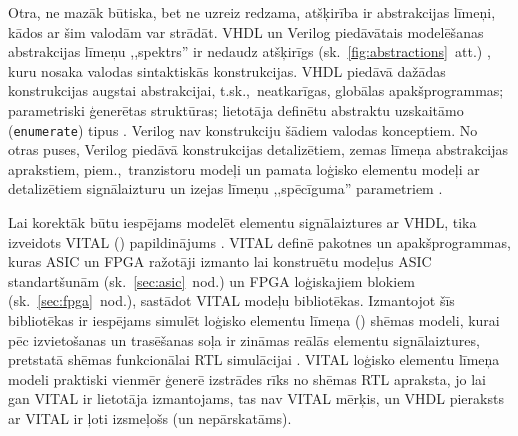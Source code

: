 	Otra, ne mazāk būtiska, bet ne uzreiz redzama, atšķirība ir abstrakcijas
	līmeņi, kādos ar šim valodām var strādāt. VHDL un Verilog piedāvātais
	modelēšanas abstrakcijas līmeņu ,,spektrs'' ir nedaudz atšķirīgs
	(sk.~\ref{fig:abstractions}~att.) \cite{vhdl-vs-verilog}, kuru nosaka
	valodas sintaktiskās konstrukcijas. VHDL piedāvā dažādas konstrukcijas
	augstai abstrakcijai, t.sk.,~neatkarīgas, globālas apakšprogrammas;
	parametriski ģenerētas struktūras; lietotāja definētu abstraktu uzskaitāmo
	(\texttt{enumerate}) tipus \cite{Mealy-VHDL}\cite{Perry-VHDL}. Verilog nav konstrukciju šādiem valodas
	konceptiem. No otras puses, Verilog piedāvā konstrukcijas detalizētiem, zemas
	līmeņa abstrakcijas aprakstiem, piem.,~tranzistoru modeļi un
	pamata loģisko elementu modeļi ar detalizētiem signālaizturu un izejas
	līmeņu ,,spēcīguma'' parametriem \cite{vhdl-vs-verilog}\cite{Kumar-Verilog}.
	
	Lai korektāk būtu iespējams modelēt elementu signālaiztures ar VHDL,
	tika izveidots VITAL ()
	papildinājums \cite{VITAL}. VITAL definē pakotnes un apakšprogrammas,
	kuras ASIC un FPGA ražotāji izmanto lai konstruētu modeļus
	ASIC standartšunām (sk.~\ref{sec:asic}~nod.) un FPGA loģiskajiem blokiem
	(sk.~\ref{sec:fpga}~nod.), sastādot VITAL modeļu bibliotēkas.
	Izmantojot šīs bibliotēkas ir iespējams simulēt loģisko elementu līmeņa
	() shēmas modeli, kurai pēc izvietošanas un trasēšanas
	soļa ir zināmas reālās elementu signālaiztures, pretstatā shēmas 
	funkcionālai RTL simulācijai \cite{Perry-VHDL}.
	VITAL loģisko elementu līmeņa modeli praktiski vienmēr ģenerē izstrādes
	rīks no shēmas RTL apraksta, jo	
	lai gan VITAL ir
	lietotāja izmantojams, tas nav VITAL mērķis, un VHDL pieraksts ar VITAL
	ir ļoti izsmeļošs (un nepārskatāms).
	
